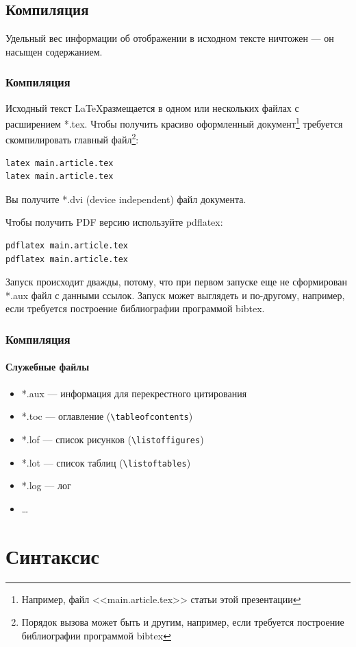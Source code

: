 \subsection{Компиляция}


Удельный вес информации об отображении в исходном тексте ничтожен --- он насыщен содержанием.


\begin{frame}[fragile]
\frametitle{Компиляция}
Исходный текст \LaTeX размещается в одном или нескольких файлах с расширением *.tex. Чтобы получить красиво \alert{оформленный} документ\footnote{Например, файл <<main.article.tex>> статьи этой презентации} требуется скомпилировать главный файл\footnote{Порядок вызова может быть и другим, например, если требуется построение библиографии программой bibtex}:

\begin{verbatim}
latex main.article.tex
latex main.article.tex
\end{verbatim}
Вы получите *.\alert{dvi} (\alert{d}e\alert{v}ice \alert{i}ndependent) файл документа.

Чтобы получить PDF версию используйте pdflatex:
\begin{verbatim}
pdflatex main.article.tex
pdflatex main.article.tex
\end{verbatim}
\end{frame}


Запуск происходит дважды, потому, что при первом запуске еще не сформирован *.aux файл с данными ссылок. Запуск может выглядеть и по-другому, например, если требуется построение библиографии программой bibtex.

\begin{frame}[fragile]
\frametitle{Компиляция}
\framesubtitle{Служебные файлы}
\begin{itemize}
    \item *.aux --- информация для перекрестного цитирования
    \item *.toc --- оглавление (\verb"\tableofcontents")
    \item *.lof --- список рисунков (\verb"\listoffigures")
    \item *.lot --- список таблиц (\verb"\listoftables")
    \item *.log --- лог
    \item \ldots
\end{itemize}
\end{frame}


\section{Синтаксис}


